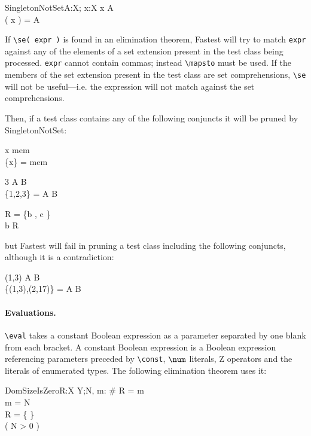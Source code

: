 \begin{theorem}{SingletonNotSet}{A:\power X; x:X}
x \notin A \\
\se( x ) = A
\end{theorem}

If \verb+\se( expr )+ is found in an elimination theorem, Fastest will try to match \verb+expr+ against any of the elements of a set extension present in the test class being processed. \verb+expr+ cannot contain commas; instead \verb+\mapsto+ must be used. If the members of the set extension present in the test class are set comprehensions, \verb+\se+ will not be useful---i.e. the expression will not match against the set comprehensions.

Then, if a test class contains any of the following conjuncts it will be pruned by SingletonNotSet:

\begin{zed}
x \notin mem \\
\{x\} = mem
\end{zed}

\begin{zed}
3 \notin A \cup B \\
\{1,2,3\} = A \cup B
\end{zed}

\begin{zed}
R = \{b , c \} \\
b  \notin R
\end{zed}

\noindent but Fastest will fail in pruning a test class including the following conjuncts, although it is a contradiction:

\begin{zed}
(1,3) \notin A \cup B \\
\{(1,3),(2,17)\} = A \cup B
\end{zed}


\paragraph{Evaluations.} \verb+\eval+ takes a constant Boolean expression as a parameter separated by one blank from each bracket. A constant Boolean expression is a Boolean expression referencing parameters preceded by \verb+\const+, $\num$ literals, Z operators and the literals of enumerated types. The following elimination theorem uses it:

\begin{theorem}{DomSizeIsZero}{R:X \rel Y;\const N, m:\nat}
\# \dom R = m \\
m = N \\
R = \{ \} \\
\eval( N > 0 )
\end{theorem}

